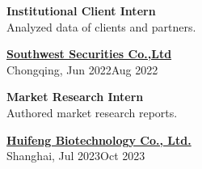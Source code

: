 \documentclass[a4paper,20pt]{article}
\begin{document}
\begin{minipage}{.4\linewidth} \begin{flushleft}
    		\textbf{Institutional Client Intern} \\ Analyzed data of clients and partners.
    	\end{flushleft} \end{minipage}
    \hfill
    \begin{minipage}{.5\linewidth}\begin{flushright}
    	\href{https://www.swsc.hk/en/site/index}{\textbf{Southwest Securities Co.,Ltd}}\\ Chongqing, Jun 2022\textemdash Aug 2022
    \end{flushright}\end{minipage}
 

\begin{minipage}{.4\linewidth} \begin{flushleft}
\textbf{Market Research Intern} \\ Authored market research reports.
    	\end{flushleft} \end{minipage}
    \hfill
    \begin{minipage}{.5\linewidth}\begin{flushright}
\href{www.cryofocus.com}{\textbf{Huifeng Biotechnology Co., Ltd.}} \\	 
Shanghai, Jul 2023\textemdash Oct 2023
    	\end{flushright}\end{minipage}
    
\end{document}

